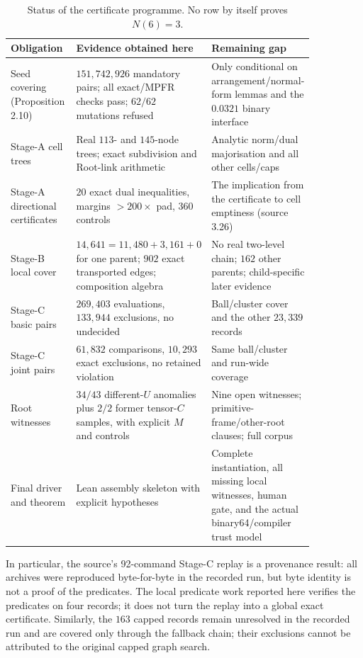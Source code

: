 \documentclass[10pt]{article}
\theoremstyle{definition}
\begin{document}
\begin{table}[ht]
\centering
\small
\begin{tabular}{p{0.25\linewidth}p{0.26\linewidth}p{0.34\linewidth}}
\toprule
Obligation & Evidence obtained here & Remaining gap \\
\midrule
Seed covering (Proposition 2.10) & $151{,}742{,}926$ mandatory pairs; all exact/MPFR checks pass; $62/62$ mutations refused & Only conditional on arrangement/normal-form lemmas and the $0.0321$ binary interface \\
Stage-A cell trees & Real $113$- and $145$-node trees; exact subdivision and Root-link arithmetic & Analytic norm/dual majorisation and all other cells/caps \\
Stage-A directional certificates & $20$ exact dual inequalities, margins $>200\times$ pad, $360$ controls & The implication from the certificate to cell emptiness (source 3.26) \\
Stage-B local cover & $14{,}641=11{,}480+3{,}161+0$ for one parent; $902$ exact transported edges; composition algebra & No real two-level chain; $162$ other parents; child-specific later evidence \\
Stage-C basic pairs & $269{,}403$ evaluations, $133{,}944$ exclusions, no undecided & Ball/cluster cover and the other $23{,}339$ records \\
Stage-C joint pairs & $61{,}832$ comparisons, $10{,}293$ exact exclusions, no retained violation & Same ball/cluster and run-wide coverage \\
Root witnesses & $34/43$ different-$U$ anomalies plus $2/2$ former tensor-$C$ samples, with explicit $M$ and controls & Nine open witnesses; primitive-frame/other-root clauses; full corpus \\
Final driver and theorem & Lean assembly skeleton with explicit hypotheses & Complete instantiation, all missing local witnesses, human gate, and the actual binary64/compiler trust model \\
\bottomrule
\end{tabular}
\caption{Status of the certificate programme. No row by itself proves $N(6)=3$.}
\label{tab:status}
\end{table}

In particular, the source's 92-command Stage-C replay is a provenance result: all archives were reproduced byte-for-byte in the recorded run, but byte identity is not a proof of the predicates. The local predicate work reported here verifies the predicates on four records; it does not turn the replay into a global exact certificate. Similarly, the $163$ capped records remain unresolved in the recorded run and are covered only through the fallback chain; their exclusions cannot be attributed to the original capped graph search.
\end{document}
